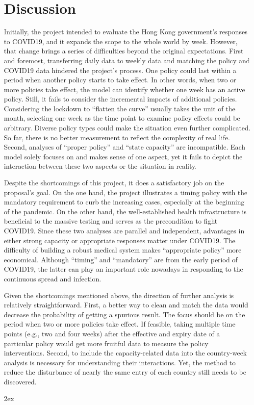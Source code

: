 \documentclass[12pt]{class}
\begin{document}
\section*{Discussion}
Initially, the project intended to evaluate the Hong Kong government’s responses to COVID19, and it expands the scope to the whole world by week. However, that change brings a series of difficulties beyond the original expectations. First and foremost, transferring daily data to weekly data and matching the policy and COVID19 data hindered the project’s process. One policy could last within a period when another policy starts to take effect. In other words, when two or more policies take effect, the model can identify whether one week has an active policy. Still, it fails to consider the incremental impacts of additional policies. Considering the lockdown to “flatten the curve” usually takes the unit of the month, selecting one week as the time point to examine policy effects could be arbitrary. Diverse policy types could make the situation even further complicated. So far, there is no better measurement to reflect the complexity of real life. Second, analyses of “proper policy” and “state capacity” are incompatible. Each model solely focuses on and makes sense of one aspect, yet it fails to depict the interaction between these two aspects or the situation in reality. \par 
Despite the shortcomings of this project, it does a satisfactory job on the proposal’s goal. On the one hand, the project illustrates a timing policy with the mandatory requirement to curb the increasing cases, especially at the beginning of the pandemic. On the other hand, the well-established health infrastructure is beneficial to the massive testing and serves as the precondition to fight COVID19. Since these two analyses are parallel and independent, advantages in either strong capacity or appropriate responses matter under COVID19. The difficulty of building a robust medical system makes “appropriate policy” more economical. Although “timing” and “mandatory” are from the early period of COVID19, the latter can play an important role nowadays in responding to the continuous spread and infection. \par

Given the shortcomings mentioned above, the direction of further analysis is relatively straightforward. First, a better way to clean and match the data would decrease the probability of getting a spurious result. The focus should be on the period when two or more policies take effect. If feasible, taking multiple time points (e.g., two and four weeks) after the effective and expiry date of a particular policy would get more fruitful data to measure the policy interventions. Second, to include the capacity-related data into the country-week analysis is necessary for understanding their interactions. Yet, the method to reduce the disturbance of nearly the same entry of each country still needs to be discovered. 


\newpage
\begingroup
\parindent 0pt
\parskip 2ex
\def\enotesize{\footnotesize}
\theendnotes
\endgroup
\end{document}
